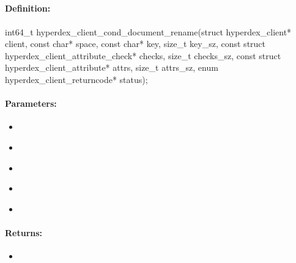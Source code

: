 \pagebreak
\subsection{}
\label{api:c:cond_document_rename}


\paragraph{Definition:}
\begin{ccode}
int64_t hyperdex_client_cond_document_rename(struct hyperdex_client* client,
        const char* space,
        const char* key, size_t key_sz,
        const struct hyperdex_client_attribute_check* checks, size_t checks_sz,
        const struct hyperdex_client_attribute* attrs, size_t attrs_sz,
        enum hyperdex_client_returncode* status);
\end{ccode}

\paragraph{Parameters:}
\begin{itemize}[noitemsep]
\item {}\\

\item {}\\

\item {}\\

\item {}\\

\item {}\\

\end{itemize}

\paragraph{Returns:}
\begin{itemize}[noitemsep]
\item {}\\

\end{itemize}

